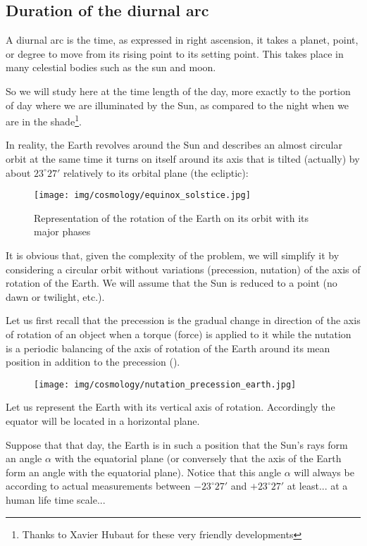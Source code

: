 	\subsection{Duration of the diurnal arc}
	A diurnal arc is the time, as expressed in right ascension, it takes a planet, point, or degree to move from its rising point to its setting point. This takes place in many celestial bodies such as the sun and moon.
	
	So we will study here at the time length of the day, more exactly to the portion of day where we are illuminated by the Sun, as compared to the night when we are in the shade\footnote{Thanks to Xavier Hubaut for these very friendly developments}.
	
	In reality, the Earth revolves around the Sun and describes an almost circular orbit at the same time it turns on itself around its axis that is tilted (actually) by about $23^\circ 27'$ relatively to its orbital plane (the ecliptic):
	\begin{figure}[H]
		\begin{center}
		\texttt{[image: img/cosmology/equinox\_solstice.jpg]}
		\end{center}	
		\caption{Representation of the rotation of the Earth on its orbit with its major phases}
	\end{figure}
	\begin{tcolorbox}[title=Remark,colframe=black,arc=10pt]
	It is obvious that, given the complexity of the problem, we will simplify it by considering a circular orbit without variations (precession, nutation) of the axis of rotation of the Earth. We will assume that the Sun is reduced to a point (no dawn or twilight, etc.).
	\end{tcolorbox}
	Let us first recall that the precession is the gradual change in direction of the axis of rotation of an object when a torque (force) is applied to it while the nutation is a periodic balancing of the axis of rotation of the Earth around its mean position in addition to the precession ().
	\begin{figure}[H]
		\begin{center}
		\texttt{[image: img/cosmology/nutation\_precession\_earth.jpg]}
		\end{center}
	\end{figure}
	Let us represent the Earth with its vertical axis of rotation. Accordingly the equator will be located in a horizontal plane.

	Suppose that that day, the Earth is in such a position that the Sun's rays form an angle $\alpha$ with the equatorial plane (or conversely that the axis of the Earth form an angle with the equatorial plane). Notice that this angle $\alpha$ will always be according to actual measurements  between $-23^\circ 27'$ and $+23^\circ 27'$ at least... at a human life time scale...
	
